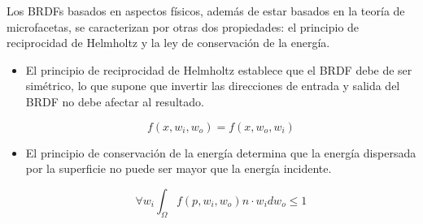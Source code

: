 
Los BRDFs basados en aspectos f\'isicos, adem\'as de estar basados en la teor\'ia de microfacetas, se caracterizan por otras dos
propiedades: el principio de reciprocidad de Helmholtz y la ley de conservaci\'on de la energ\'ia.

\begin{itemize}
    \item
        El principio de reciprocidad de Helmholtz establece que el BRDF debe de ser simétrico, lo que supone que invertir las direcciones
        de entrada y salida del BRDF no debe afectar al resultado.
        
        \begin{equation}
            f(x, w_i, w_o) = f(x, w_o, w_i)
        \end{equation}
        \singlespacing

        \item El principio de conservaci\'on de la energ\'ia determina que la energ\'ia dispersada por la superficie no puede
    ser mayor que la energ\'ia incidente.

    \begin{equation}
        \forall w_i \int_{\Omega} f(p, w_i, w_o) n\cdot{w_i} dw_o \leq 1
    \end{equation}
\end{itemize}
\singlespacing

